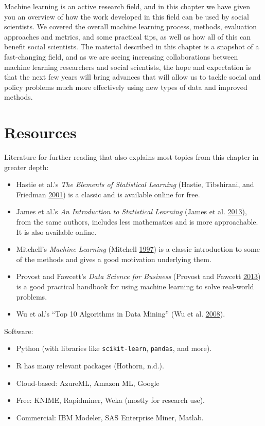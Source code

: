 \documentclass[]{krantz}
\begin{document}
Machine learning is an active research field, and in this chapter we
have given you an overview of how the work developed in this field can
be used by social scientists. We covered the overall machine learning
process, methods, evaluation approaches and metrics, and some practical
tips, as well as how all of this can benefit social scientists. The
material described in this chapter is a snapshot of a fast-changing
field, and as we are seeing increasing collaborations between machine
learning researchers and social scientists, the hope and expectation is
that the next few years will bring advances that will allow us to tackle
social and policy problems much more effectively using new types of data
and improved methods.

\hypertarget{ml:res}{\section{Resources}\label{ml:res}}

Literature for further reading that also explains most topics from this
chapter in greater depth:

\begin{itemize}
\item
  Hastie et al.'s \emph{The Elements of Statistical Learning} (Hastie,
  Tibshirani, and Friedman
  \protect\hyperlink{ref-HastieTibshirani}{2001}) is a classic and is
  available online for free.
\item
  James et al.'s \emph{An Introduction to Statistical Learning} (James
  et al. \protect\hyperlink{ref-james2013introduction}{2013}), from the
  same authors, includes less mathematics and is more approachable. It
  is also available online.
\item
  Mitchell's \emph{Machine Learning} (Mitchell
  \protect\hyperlink{ref-mitchell1997machine}{1997}) is a classic
  introduction to some of the methods and gives a good motivation
  underlying them.
\item
  Provost and Fawcett's \emph{Data Science for Business} (Provost and
  Fawcett \protect\hyperlink{ref-FawcettProvost}{2013}) is a good
  practical handbook for using machine learning to solve real-world
  problems.
\item
  Wu et al.'s ``Top 10 Algorithms in Data Mining'' (Wu et al.
  \protect\hyperlink{ref-wu2008top}{2008}).
\end{itemize}

Software:

\begin{itemize}
\item
  Python (with libraries like \texttt{scikit-learn}, \texttt{pandas},
  and more).
\item
  R has many relevant packages (Hothorn, n.d.).
\item
  Cloud-based: AzureML, Amazon ML, Google
\item
  Free: KNIME, Rapidminer, Weka (mostly for research use).
\item
  Commercial: IBM Modeler, SAS Enterprise Miner, Matlab.
\end{itemize}
\end{document}
